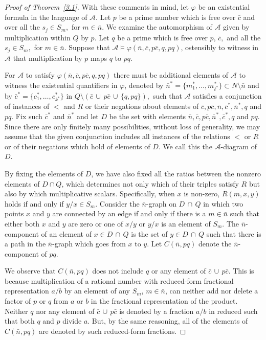 \documentclass[12pt,fullpage]{article}
\theoremstyle{definition}
\theoremstyle{remark}
\newcommand{\A}{\mathcal{A}}
\renewcommand{\phi}{\varphi}
\begin{document}
\begin{proof}[Proof of Theorem~\ref{3.1}]
With these comments in mind, let $\phi$ be  an existential formula in the language of $\A$.  Let $p$ be a prime number which is free over $\bar{c}$ and over all the $s_j\in S_m,$ for $m\in\bar{n}.$ We examine the automorphism of $\A$ given by multiplication within $Q$ by $p$. Let $q$ be a prime which is free over  $p$, $\bar{c},$  and all the $s_j\in S_m,$ for $m\in\bar{n}.$  Suppose that $\A\models\phi(\bar{n},\bar{c}, p\bar{c},q,pq)$, ostensibly to witness in $\A$ that multiplication by $p$ maps $q$ to $pq$.

For $\A$ to satisfy $\phi(\bar{n},\bar{c}, p\bar{c}, q,pq)$ there must be additional elements of $\A$ to witness the existential quantifiers in $\phi$, denoted by $\bar{n}^*=\{m^*_1,\dots,m^*_{\ell^*}\}\subset N\setminus \bar{n}$ and by $\bar{c}^*=\{c^*_1,\dots,c^*_{k^*}\}$ in $Q\setminus(\bar{c}\,\cup\,p\bar{c}\,\cup\,\{q,pq\}),$ 
such that $\A$ satisfies a conjunction of instances of $<$ and $R$ or their negations about elements of $\bar{c},p\bar{c},\bar{n},\bar{c}^*,\bar{n}^*, q$ and $pq$.  Fix such $\bar{c}^*$ and $\bar{n}^*$ and let $D$ be the set with elements $\bar{n},\bar{c},p\bar{c},\bar{n}^*,\bar{c}^*,q$ and $pq$.   Since there are only finitely many possibilities, without loss of generality, we may assume that the given conjunction includes all instances of the relations $<$ or $R$ or of their negations which hold of elements of $D.$   We call this the $\A$-diagram of $D$.

\newcommand{\Cnpq}{C(\bar{n},pq)}

By fixing the elements of $D$, we have also fixed all the ratios between the nonzero elements of $D\cap Q$, which determines not only  which of their triples satisfy $R$ but also by which multiplicative scalars.  Specifically, when $x$ is non-zero, $R(m,x,y)$ holds if and only if $y/x\in S_m$.  Consider  the $\bar{n}$-graph on $D\,\cap\,Q$ in which two points $x$ and $y$ are connected by an edge if and only if there is a $m\in\bar{n}$ such that either both $x$ and $y$ are zero or one of $x/y$ or $y/x$ is an element of $S_{m}$.   The $\bar{n}$-component of an element of $x\in D\,\cap\,Q$ is the set of $y\in D\,\cap\,Q$ such that there is a path in the $\bar{n}$-graph which goes from $x$ to $y$.  Let $\Cnpq$ denote the $\bar{n}$-component of $pq$.  

We observe that $\Cnpq$ does not include $q$ or any element of $\bar{c}\,\cup\,p\bar{c}$.  This is because multiplication of a rational number with reduced-form fractional representation $a/b$ by an element of any $S_{m}$, $m\in\bar{n}$, can neither add nor delete a factor of $p$ or $q$ from $a$ or $b$ in the fractional representation of the product. Neither $q$ nor any element of $\bar{c}\,\cup\,p\bar{c}$ is denoted by a fraction $a/b$ in reduced such that both $q$ and $p$ divide $a$.  But, by the same reasoning, all of the elements of $\Cnpq$ are denoted by such reduced-form fractions.


\end{proof}
\end{document}
